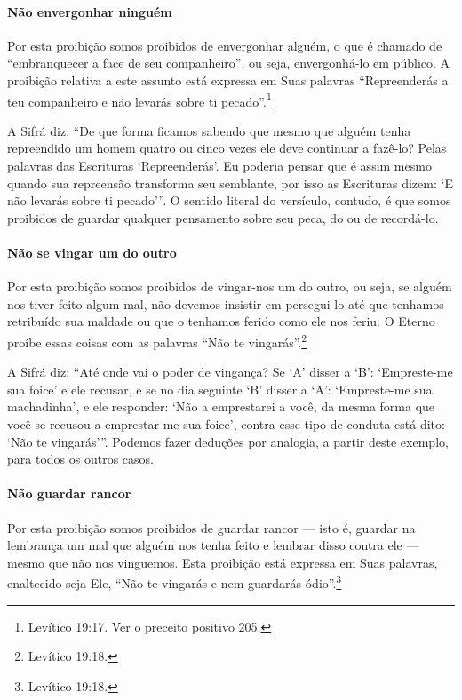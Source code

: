 \paragraph{Não envergonhar ninguém}

Por esta proibição somos proibidos de envergonhar alguém, o que é
chamado de ``embranquecer a face de seu companheiro'', ou seja,
envergonhá-lo em público. A proibição relativa a este assunto está expressa em
Suas palavras ``Repreenderás a teu companheiro e não levarás sobre ti
pecado''.\footnote{Levítico 19:17. Ver o preceito positivo 205.}

A Sifrá diz: ``De que forma ficamos sabendo que mesmo que alguém tenha
repreendido um homem quatro ou cinco vezes ele deve continuar a fazê-lo?
Pelas palavras das Escrituras `Repreenderás'. Eu poderia pensar que é
assim mesmo quando sua repreensão transforma seu semblante, por isso as
Escrituras dizem: `E não levarás sobre ti pecado'''. O sentido literal
do versículo, contudo, é que somos proibidos de guardar qualquer
pensamento sobre seu peca, do ou de recordá-lo.

\paragraph{Não se vingar um do outro}

Por esta proibição somos proibidos de vingar-nos um do outro, ou seja,
se alguém nos tiver feito algum mal, não devemos insistir em persegui-lo
até que tenhamos retribuído sua maldade ou que o tenhamos ferido como
ele nos feriu. O Eterno proíbe essas coisas com as palavras ``Não te
vingarás''.\footnote{Levítico 19:18.}

A Sifrá diz: ``Até onde vai o poder de vingança? Se `A' disser a `B':
`Empreste-me sua foice' e ele recusar, e se no dia seguinte `B' disser a
`A': `Empreste-me sua machadinha', e ele responder: `Não a emprestarei a
você, da mesma forma que você se recusou a emprestar-me sua foice',
contra esse tipo de conduta está dito: `Não te vingarás'''. Podemos
fazer deduções por analogia, a partir deste exemplo, para todos os
outros casos.

\paragraph{Não guardar rancor}

Por esta proibição somos proibidos de guardar rancor --- isto é,
guardar na lembrança um mal que alguém nos tenha feito e lembrar disso
contra ele --- mesmo que não nos vinguemos. Esta proibição está expressa
em Suas palavras, enaltecido seja Ele, ``Não te vingarás e nem
guardarás ódio''.\footnote{Levítico 19:18.}

